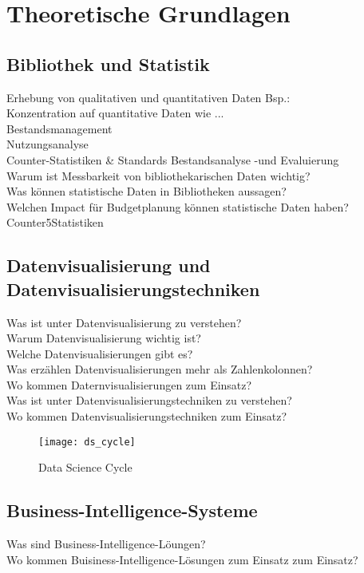 \chapter{Theoretische Grundlagen}
\label{chap:two}
\section{Bibliothek und Statistik}
\label{chap:two_one}

Erhebung von qualitativen und quantitativen Daten Bsp.:\\

Konzentration auf quantitative Daten wie ...\\

Bestandsmanagement\\
Nutzungsanalyse\\
Counter-Statistiken \& Standards
Bestandsanalyse -und Evaluierung\\

Warum ist Messbarkeit von bibliothekarischen Daten wichtig?\\
Was können statistische Daten in Bibliotheken aussagen?\\
Welchen Impact für Budgetplanung können statistische Daten haben?\\

Counter5Statistiken
\section{Datenvisualisierung und Datenvisualisierungstechniken}
Was ist unter Datenvisualisierung zu verstehen?\\
Warum Datenvisualisierung wichtig ist?\\
Welche Datenvisualisierungen gibt es?\\
Was erzählen Datenvisualisierungen mehr als Zahlenkolonnen?\\
Wo kommen Daternvisualisierungen zum Einsatz?\\
Was ist unter Datenvisualisierungstechniken zu verstehen?\\
Wo kommen Datenvisualisierungstechniken zum Einsatz?


\begin{figure}[ht]
    \centering
        \texttt{[image: ds\_cycle]}
        \caption{Data Science Cycle}
        \label{fig:data science}
\end{figure}




\section{Business-Intelligence-Systeme}

Was sind Business-Intelligence-Löungen?\\
Wo kommen Buisiness-Intelligence-Lösungen zum Einsatz zum Einsatz?
